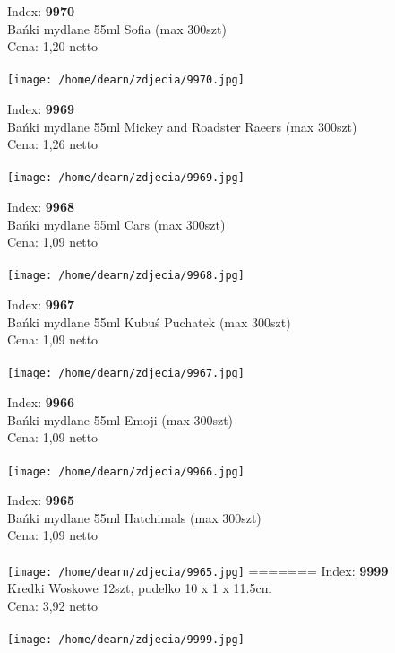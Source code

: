 {Index: \textbf{9970}\\
Bańki mydlane 55ml Sofia (max 300szt)\\
Cena: 1,20 netto   \\\\  \texttt{[image: /home/dearn/zdjecia/9970.jpg]}}\newline\newline

{Index: \textbf{9969}\\
Bańki mydlane 55ml Mickey and Roadster Raeers (max 300szt)\\
Cena: 1,26 netto   \\\\  \texttt{[image: /home/dearn/zdjecia/9969.jpg]}}\newline\newline

{Index: \textbf{9968}\\
Bańki mydlane 55ml Cars (max 300szt)\\
Cena: 1,09 netto   \\\\  \texttt{[image: /home/dearn/zdjecia/9968.jpg]}}\newline\newline

{Index: \textbf{9967}\\
Bańki mydlane 55ml Kubuś Puchatek (max 300szt)\\
Cena: 1,09 netto   \\\\  \texttt{[image: /home/dearn/zdjecia/9967.jpg]}}\newline\newline

{Index: \textbf{9966}\\
Bańki mydlane 55ml Emoji (max 300szt)\\
Cena: 1,09 netto   \\\\  \texttt{[image: /home/dearn/zdjecia/9966.jpg]}}\newline\newline

{Index: \textbf{9965}\\
Bańki mydlane 55ml Hatchimals (max 300szt)\\
Cena: 1,09 netto   \\\\  \texttt{[image: /home/dearn/zdjecia/9965.jpg]}}\newline\newline
=======
{Index: \textbf{9999}\\
Kredki Woskowe 12szt, pudelko 10 x 1 x 11.5cm \\
Cena: 3,92 netto   \\\\  \texttt{[image: /home/dearn/zdjecia/9999.jpg]}}\newline\newline

